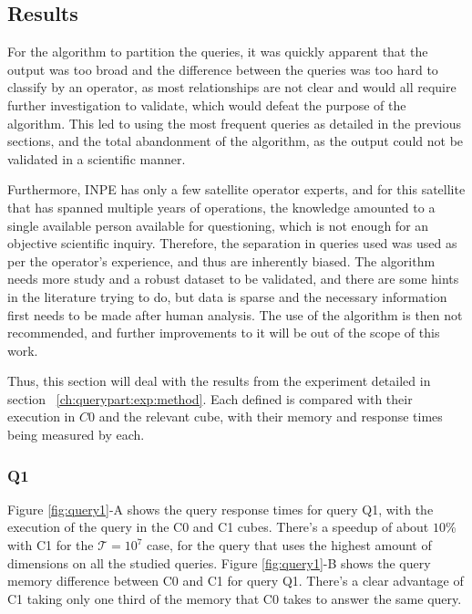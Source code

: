 \subsection{Results}\label{ch:querypart:exp:results}

For the algorithm to partition the queries, it was quickly apparent that the output was too broad and the difference between the queries was too hard to classify by an operator, as most relationships are not clear and would all require further investigation to validate, which would defeat the purpose of the algorithm.
This led to using the most frequent queries as detailed in the previous sections, and the total abandonment of the algorithm, as the output could not be validated in a scientific manner.

Furthermore, INPE has only a few satellite operator experts, and for this satellite that has spanned multiple years of operations, the knowledge amounted to a single available person available for questioning, which is not enough for an objective scientific inquiry.
Therefore, the separation in queries used was used as per the operator's experience, and thus are inherently biased.
The algorithm needs more study and a robust dataset to be validated, and there are some hints in the literature trying to do, but data is sparse and the necessary information first needs to be made after human analysis.
The use of the algorithm is then not recommended, and further improvements to it will be out of the scope of this work.

Thus, this section will deal with the results from the experiment detailed in section ~\ref{ch:querypart:exp:method}.
Each defined is compared with their execution in $C0$ and the relevant cube, with their memory and response times being measured by each.

\hypertarget{q1-1}{%
\subsubsection{Q1}\label{q1-1}}

Figure \ref{fig:query1}-A shows the query response times for query Q1, with the execution of the query in the C0 and C1 cubes.
There's a speedup of about \(10\)\% with C1 for the \(\mathcal{T} =\ensuremath{10^{7}}\) case, for the query that uses the highest amount of dimensions on all the studied queries.
Figure \ref{fig:query1}-B shows the query memory difference between C0 and C1 for query Q1.
There's a clear advantage of C1 taking only one third of the memory that C0 takes to answer the same query.

